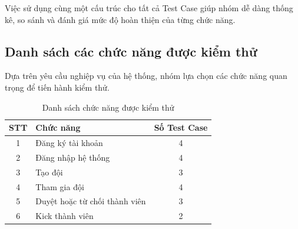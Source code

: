 Việc sử dụng cùng một cấu trúc cho tất cả Test Case giúp nhóm dễ dàng thống kê, so sánh và đánh giá mức độ hoàn thiện của từng chức năng.


\subsection{Danh sách các chức năng được kiểm thử}

Dựa trên yêu cầu nghiệp vụ của hệ thống, nhóm lựa chọn các chức năng quan trọng để tiến hành kiểm thử.

\begin{table}[H]
	\centering
	\caption{Danh sách chức năng được kiểm thử}
	\label{tab:test-module}
	
	\renewcommand{\arraystretch}{1.3}
	
	\begin{tabular}{|c|p{8cm}|c|}
		
		\hline
		
		\textbf{STT} &
		\textbf{Chức năng} &
		\textbf{Số Test Case}
		
		\\
		
		\hline
		
		1 &
		Đăng ký tài khoản &
		4
		
		\\
		
		\hline
		
		2 &
		Đăng nhập hệ thống &
		4
		
		\\
		
		\hline
		
		3 &
		Tạo đội &
		3
		
		\\
		
		\hline
		
		4 &
		Tham gia đội &
		4
		
		\\
		
		\hline
		
		5 &
		Duyệt hoặc từ chối thành viên &
		3
		
		\\
		
		\hline
		
		6 &
		Kick thành viên &
		2
		
		\\
		

\end{tabular}
\end{table}
